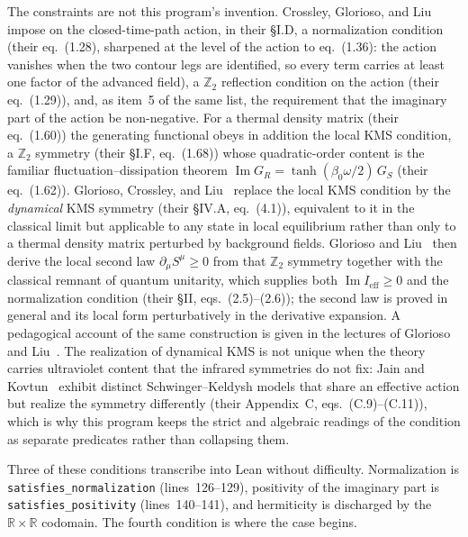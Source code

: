 \documentclass[11pt]{article}
\begin{document}
The constraints are not this program's invention. Crossley, Glorioso,
and Liu~\cite{CrossleyGloriosoLiu2017} impose on the closed-time-path
action, in their \S I.D, a normalization condition (their eq.~(1.28),
sharpened at the level of the action to eq.~(1.36): the action vanishes
when the two contour legs are identified, so every term carries at
least one factor of the advanced field), a $\mathbb{Z}_2$ reflection
condition on the action (their eq.~(1.29)), and, as item~5 of the same
list, the requirement that the imaginary part of the action be
non-negative. For a thermal density matrix (their eq.~(1.60)) the
generating functional obeys in addition the local KMS condition, a
$\mathbb{Z}_2$ symmetry (their \S I.F, eq.~(1.68)) whose quadratic-order
content is the familiar fluctuation--dissipation theorem
$\operatorname{Im}G_R = \tanh(\beta_0\omega/2)\,G_S$ (their eq.~(1.62)).
Glorioso, Crossley, and Liu~\cite{GloriosoCrossleyLiu2017} replace the
local KMS condition by the \emph{dynamical} KMS symmetry (their \S IV.A,
eq.~(4.1)), equivalent to it in the classical limit but applicable to
any state in local equilibrium rather than only to a thermal density
matrix perturbed by background fields. Glorioso and
Liu~\cite{GloriosoLiu2018} then derive the local second law
$\partial_\mu S^\mu \ge 0$ from that $\mathbb{Z}_2$ symmetry together
with the classical remnant of quantum unitarity, which supplies both
$\operatorname{Im}I_{\mathrm{eff}} \ge 0$ and the normalization
condition (their \S II, eqs.~(2.5)--(2.6)); the second law is proved in
general and its local form perturbatively in the derivative expansion.
A pedagogical account of the same construction is given in the lectures
of Glorioso and Liu~\cite{GloriosoLiu2018TASI}. The realization of
dynamical KMS is not unique when the theory carries ultraviolet content
that the infrared symmetries do not fix: Jain and
Kovtun~\cite{JainKovtun2024} exhibit distinct Schwinger--Keldysh models
that share an effective action but realize the symmetry differently
(their Appendix~C, eqs.~(C.9)--(C.11)), which is why this program keeps
the strict and algebraic readings of the condition as separate
predicates rather than collapsing them.

Three of these conditions transcribe into Lean without difficulty.
Normalization is \texttt{satisfies\_normalization} (lines~126--129),
positivity of the imaginary part is \texttt{satisfies\_positivity}
(lines~140--141), and hermiticity is discharged by the
$\mathbb{R}\times\mathbb{R}$ codomain. The fourth condition is where the
case begins.
\end{document}
